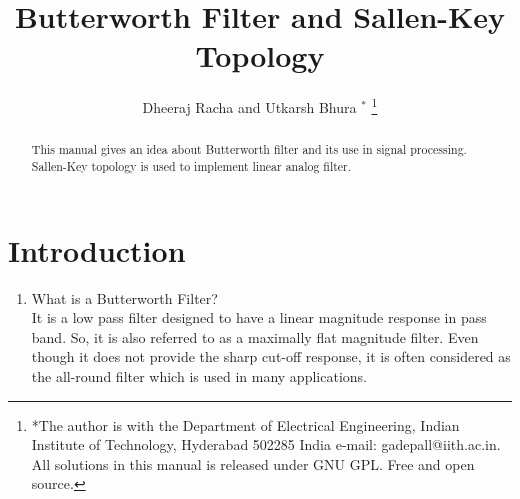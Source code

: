 \documentclass[journal,12pt,twocolumn]{IEEEtran}
\renewcommand\thesection{\arabic{section}}
\begin{document}
\makeatletter
{}
\makeatother
\let\StandardTheFigure\thefigure
\renewcommand{\thefigure}{\thesection}
\makeatletter
{}
\makeatother
\let\StandardTheFigure\thefigure
\let\StandardTheTable\thetable
\let\vec\mathbf
\def\putbox#1#2#3{\makebox[0in][l]{\makebox[#1][l]{}\raisebox{\baselineskip}[0in][0in]{\raisebox{#2}[0in][0in]{#3}}}}
     \def\rightbox#1{\makebox[0in][r]{#1}}
     \def\centbox#1{\makebox[0in]{#1}}
     \def\topbox#1{\raisebox{-\baselineskip}[0in][0in]{#1}}
     \def\midbox#1{\raisebox{-0.5\baselineskip}[0in][0in]{#1}}
\vspace{3cm}
\title{ 
Butterworth Filter and Sallen-Key Topology
}
\author{ Dheeraj Racha and Utkarsh Bhura $^{*}$%
	\thanks{*The author is with the Department
		of Electrical Engineering, Indian Institute of Technology, Hyderabad
		502285 India e-mail:  gadepall@iith.ac.in. All solutions in this manual is released under GNU 
GPL.  Free and open source.}
	
}
\maketitle
\tableofcontents
\bigskip
\renewcommand{\thefigure}{\theenumi}
\renewcommand{\thetable}{\theenumi}
\begin{abstract}
This manual gives an idea about Butterworth filter and its use in signal processing. Sallen-Key topology is used to implement linear analog filter.   
\end{abstract}
\section{Introduction}
\begin{enumerate}[label=\thesection.\arabic*,ref=\thesection.\theenumi]
\item What is a Butterworth Filter?\\
\solution It is a low pass filter designed to have a linear magnitude response in pass band. So, it is also referred to as a maximally flat magnitude filter. Even though it does not provide the sharp cut-off response, it is often considered as the all-round filter which is used in many applications.

\end{enumerate}
\end{document}
